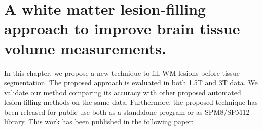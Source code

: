 
\chapter{A white matter lesion-filling approach to improve brain tissue volume measurements.}

\label{chapter:chapter_4}

In this chapter, we propose a new technique to fill WM lesions before tissue segmentation. The proposed approach is evaluated in both 1.5T and 3T data. We validate our method comparing its accuracy with other proposed automated lesion filling methods on the same data. Furthermore, the proposed technique has been released for public use both as a standalone program or as SPM8/SPM12 library.  
This work has been published in the following paper:

\vspace{2cm}

\noindent{}




